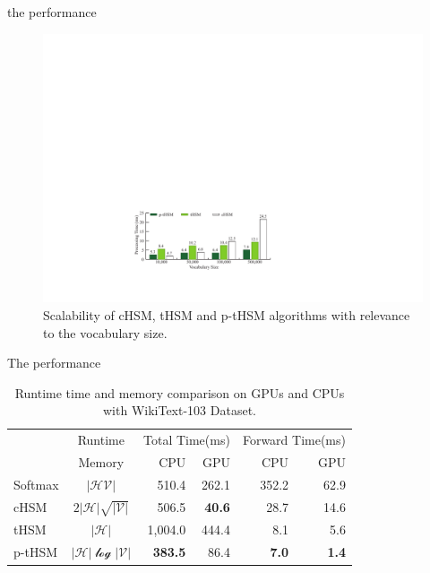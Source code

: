 \documentclass[english]{beamer} %
\begin{document}
\begin{frame}[<+->]{the performance}
\begin{figure}[!t]
\setlength{\abovecaptionskip}{0pt}
\setlength{\belowcaptionskip}{0pt}
  \centering
  \includegraphics[width=0.95\columnwidth]{all_time}
  \caption{Scalability of cHSM, tHSM and p-tHSM algorithms with relevance to the vocabulary size.}\label{fig:hsm_benchmark}
\end{figure}
\end{frame}
\begin{frame}[<+->]{The performance}

\begin{table}[!t]
\setlength{\abovecaptionskip}{0pt}
\setlength{\abovedisplayskip}{0pt}
  \centering
  \caption{Runtime time and memory comparison on GPUs and CPUs with WikiText-103 Dataset.\label{tab:time}}
\begin{tabular}{lcrrrr}
  \toprule
   &Runtime &\multicolumn{2}{c}{Total Time(ms)} & \multicolumn{2}{c}{Forward Time(ms)}   \\
   \cmidrule(lr){3-4}  \cmidrule(lr){5-6}
	&Memory & CPU&GPU & CPU& GPU \\ \midrule
Softmax & $\mathcal{|HV|}$ &510.4  &262.1&352.2& 62.9 \\
cHSM    & $2\mathcal{|H|\sqrt{|V|}}$&506.5  &\textbf{40.6}&28.7&14.6 \\
tHSM    &$\mathcal{|H|}$&1,004.0 &444.4 & 8.1&  5.6   \\
p-tHSM  &$\mathcal{|H|\log{|V|}}$ &\textbf{383.5}&	86.4 &\textbf{7.0}&	\textbf{1.4} \\
  \bottomrule
\end{tabular}
\end{table}
\end{frame}
\end{document}
